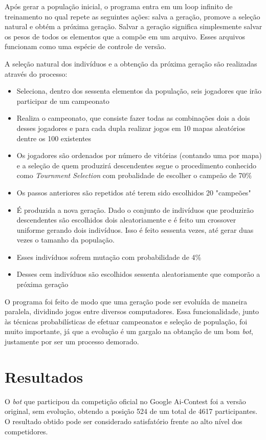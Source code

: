 \documentclass[a4paper,titlepage,11pt]{article}
\begin{document}
Após gerar a população inicial, o programa entra em um loop infinito de treinamento no qual repete as seguintes ações: salva a geração, promove a seleção natural e obtém a próxima geração. Salvar a geração significa simplesmente salvar os pesos de todos os elementos que a compõe em um arquivo. Esses arquivos funcionam como uma espécie de controle de versão.

A seleção natural dos indivíduos e a obtenção da próxima geração são realizadas através do processo:
\begin{itemize}
	\item Seleciona, dentro dos sessenta elementos da população, seis jogadores que irão participar de um campeonato
	\item Realiza o campeonato, que consiste fazer todas as combinações dois a dois desses jogadores e para cada dupla realizar jogos em 10 mapas aleatórios dentre os 100 existentes 
	\item Os jogadores são ordenados por número de vitórias (contando uma por mapa) e a seleção de quem produzirá descendentes segue o procedimento conhecido como {\em Tournment Selection} com probalidade de escolher o campeão de 70\%
	\item Os passos anteriores são repetidos até terem sido escolhidos 20 "campeões"
	\item É produzida a nova geração. Dado o conjunto de indivíduos que produzirão descendentes são escolhidos dois aleatoriamente e é feito um crossover uniforme gerando dois indivíduos. Isso é feito sessenta vezes, até gerar duas vezes o tamanho da população. 
	\item Esses indivíduos sofrem mutação com probabilidade de 4\%
	\item Desses cem indivíduos são escolhidos sessenta aleatoriamente que comporão a próxima geração
\end{itemize}

O programa foi feito de modo que uma geração pode ser evoluída de maneira paralela, dividindo jogos entre diversos computadores. Essa funcionalidade, junto às técnicas probabilísticas de efetuar campeonatos e seleção de população, foi muito importante, já que a evolução é um gargalo na obtanção de um bom {\em bot}, justamente por ser um processo demorado.

\section{Resultados}
O {\em bot} que participou da competição oficial no Google Ai-Contest foi a versão original, sem evolução, obtendo a posição 524 de um total de 4617 participantes. O resultado obtido pode ser considerado satisfatório frente ao alto nível dos competidores.
\end{document}
